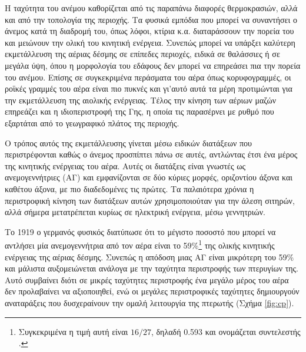 \documentclass[12pt]{report}
\begin{document}
Η ταχύτητα του ανέμου καθορίζεται από τις παραπάνω διαφορές θερμοκρασιών, αλλά και από την τοπολογία της περιοχής. Τα φυσικά εμπόδια που μπορεί να συναντήσει ο άνεμος κατά τη διαδρομή του, όπως λόφοι, κτίρια κ.α. διαταράσσουν την
πορεία του και μειώνουν την ολική του κινητική ενέργεια. Συνεπώς μπορεί να υπάρξει καλύτερη εκμετάλλευση της αέριας δέσμης σε επίπεδες περιοχές, ειδικά σε θαλάσσιες ή σε μεγάλα ύψη, όπου η μορφολογία του εδάφους δεν μπορεί να
επηρεάσει πια την πορεία του ανέμου. Επίσης σε συγκεκριμένα περάσματα του αέρα όπως κορυφογραμμές, οι ροϊκές γραμμές του αέρα είναι πιο πυκνές και γι'αυτό αυτά τα μέρη προτιμώνται για την εκμετάλλευση της αιολικής ενέργειας.
Τέλος την κίνηση των αέριων μαζών επηρεάζει και η ιδιοπεριστροφή της Γης, η οποία τις παρασέρνει με ρυθμό που εξαρτάται από το γεωγραφικό πλάτος της περιοχής.

Ο τρόπος αυτός της εκμετάλλευσης γίνεται μέσω ειδικών διατάξεων που περιστρέφονται καθώς ο άνεμος προσπίπτει πάνω σε αυτές, αντλώντας έτσι ένα μέρος της κινητικής ενέργειας του αέρα. Αυτές οι διατάξεις είναι γνωστές ως
ανεμογεννήτριες (ΑΓ) και εμφανίζονται σε δύο κύριες μορφές, οριζοντίου άξονα και καθέτου άξονα, με πιο διαδεδομένες τις πρώτες. Τα παλαιότερα χρόνια η περιστροφική κίνηση των διατάξεων αυτών χρησιμοποιούταν για την άλεση σιτηρών, 
αλλά σήμερα μετατρέπεται κυρίως σε ηλεκτρική ενέργεια, μέσω γεννητριών.

Το 1919 ο γερμανός φυσικός {} διατύπωσε ότι το μέγιστο ποσοστό που μπορεί να αντλήσει μία ανεμογεννήτρια από τον αέρα είναι το 59\%\footnote{Συγκεκριμένα η τιμή αυτή είναι \(16/27\), δηλαδή 0.593 και 
ονομάζεται συντελεστής {}.} της ολικής κινητικής ενέργειας της αέριας δέσμης. Συνεπώς η απόδοση μιας ΑΓ είναι μικρότερη του 59\% και μάλιστα αυξομειώνεται ανάλογα με την ταχύτητα περιστροφής των πτερυγίων της. 
Αυτό συμβαίνει διότι σε μικρές ταχύτητες περιστροφής ένα μεγάλο μέρος του αέρα δεν προλαβαίνει να αξιοποιηθεί, ενώ οι μεγάλες περιστροφικές ταχύτητες δημιουργούν αναταράξεις που δυσχεραίνουν την ομαλή λειτουργία της πτερωτής
(Σχήμα \ref{fig:cp}).
\end{document}
